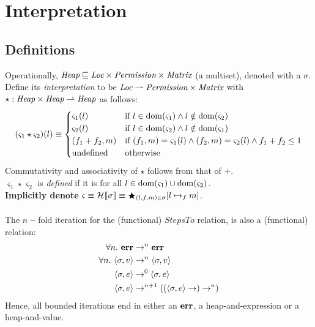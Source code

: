 \section{Interpretation}

\subsection{Definitions}

Operationally, $\emph{Heap} \sqsubseteq \emph{Loc} \times \emph{Permission}
\times \emph{Matrix} $ (a multiset), denoted with a $\sigma$.\\
Define its \emph{interpretation} to be $\emph{Loc} \rightharpoonup
\emph{Permission} \times \emph{Matrix}$ with $\star:
\emph{Heap} \times \emph{Heap} \rightharpoonup \emph{Heap}$ as follows:
\[
    (\varsigma_1 \star \varsigma_2)(l) \equiv
    \begin{cases}
        \varsigma_1(l) & \textrm{if } l \in \mathrm{dom}(\varsigma_1) \wedge l \notin \mathrm{dom}(\varsigma_2) \\
        \varsigma_2(l) & \textrm{if } l \in \mathrm{dom}(\varsigma_2) \wedge l \notin \mathrm{dom}(\varsigma_1) \\
        (f_1 + f_2, m) & \textrm{if } (f_1, m) = \varsigma_1(l) \wedge (f_2, m) = \varsigma_2(l) \wedge f_1 + f_2 \leq 1 \\
        \textrm{undefined} & \textrm{otherwise}
    \end{cases}
\]
Commutativity and associativity of $\star$ follows from that of $+$.\\
$\varsigma_1 \star \varsigma_2$ is \emph{defined} if it is for all $l \in
\mathrm{dom}(\varsigma_1) \cup \mathrm{dom}(\varsigma_2)$.\\
\textbf{Implicitly denote} $\varsigma \equiv \mathcal{H}_{} [\![ \sigma ]\!] \equiv
\bigstar_{(l,f,m) \in \sigma} [ l \mapsto_f m ]$.\\
\\
The $n-$fold iteration for the (functional) $StepsTo$ relation, is also a (functional) relation:
\begin{align*}
    \forall n.\ \mathbf{err} &\rightarrow^n \mathbf{err}\\
    \forall n.\ \langle \sigma , v \rangle &\rightarrow^n \langle \sigma , v \rangle\\
    \langle \sigma , e \rangle &\rightarrow^0 \langle \sigma , e \rangle\\
    \langle \sigma , e \rangle &\rightarrow^{n+1} ((\langle \sigma , e \rangle \rightarrow) \rightarrow^n)
\end{align*}
Hence, all bounded iterations end in either an $\mathbf{err}$, a heap-and-expression or a
heap-and-value.


